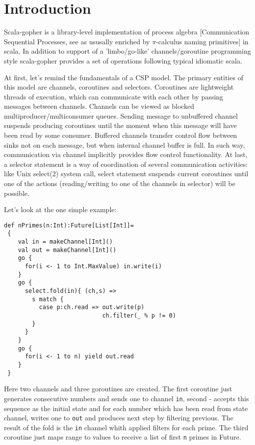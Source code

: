 \documentclass[12pt]{article}
\begin{document}
\maketitle


\section{Introduction}

 Scala-gopher is a library-level implementation of process algebra [Communication Sequential Processes, see \cite{Hoare85communicatingsequential} as ususally enriched by $\pi$-calculus \cite{Milner:1992:CMP:162037.162038} naming primitives] in scala. In addition to support of a 'limbo/go-like' \cite{Inferno:Limbo}  \cite{golang} channels/goroutine programming style scala-gopher provides a set of operations following typical idiomatic scala. 

    At first, let's remind the fundamentals of a CSP model. The primary entities of this model are channels, coroutines and selectors. Coroutines are lightweight threads of execution, which can communicate with each other by passing messages between channels. Channels can be viewed as blocked multiproducer/multiconsumer queues. Sending message to unbuffered channel suspends producing coroutines until the moment when this message will have been read by some consumer. Buffered channels transfer control flow between sinks not on each message, but when internal channel buffer is full.  
In such way, communication via channel implicitly provides flow control functionality.  At last, a selector statement is a way of coordination of several communication activities: like Unix select(2) system call, select statement suspends current coroutines until one of the actions (reading/writing to one of the channels in selector) will be possible.

   Let's look at the one simple example:
\begin{Verbatim}[fontsize=\small]
 def nPrimes(n:Int):Future[List[Int]]=
 {
    val in = makeChannel[Int]()
    val out = makeChannel[Int]()
    go {
      for(i <- 1 to Int.MaxValue) in.write(i)
    }
    go {
      select.fold(in){ (ch,s) =>
        s match {
          case p:ch.read => out.write(p)
                            ch.filter(_ % p != 0)
        }
      }
    }
    go {
      for(i <- 1 to n) yield out.read
    }
 }
\end{Verbatim}
  Here two channels and three goroutines are created.  The first coroutine just generates consecutive numbers and sends one to channel \verb|in|, second - accepts this sequence as the initial state and for each number which has been read from state channel, writes one to \verb|out| and produces next step by filtering previous. The result of the fold is the \verb|in| channel whith applied filters for each prime. The third coroutine just maps range to values to receive a list of first \verb|n| primes in Future.
\end{document}
